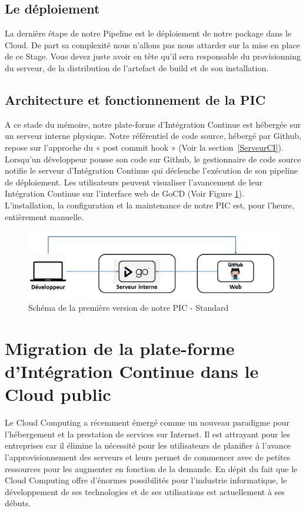       \subsection{Le déploiement}
      La dernière étape de notre Pipeline est le déploiement de notre package dans le Cloud. De part sa complexité nous n'allons pas nous attarder sur la mise en place de ce Stage. Vous devez juste avoir en tête qu'il sera responsable du provisionning du serveur, de la distribution de l'artefact de build et de son installation.

      \subsection{Architecture et fonctionnement de la PIC}
      A ce stade du mémoire, notre plate-forme d'Intégration Continue est hébergée sur un serveur interne physique. Notre référentiel de code source, hébergé par Github, repose sur l'approche du « post commit hook » (Voir la section~\ref{ServeurCI}). Lorsqu'un développeur pousse son code sur Github, le gestionnaire de code source notifie le serveur d'Intégration Continue qui déclenche l'exécution de son pipeline de déploiement. Les utilisateurs peuvent visualiser l'avancement de leur Intégration Continue sur l'interface web de GoCD (Voir Figure \ref{PICv1}).\\

      L'installation, la configuration et la maintenance de notre PIC est, pour l'heure, entièrement manuelle.\\

      \begin{figure}
        \begin{center}
          \includegraphics[scale=0.5]{images/PICv1.png}
        \end{center}
        \caption{Schéma de la première version de notre PIC - Standard}
        \label{PICv1}
      \end{figure}

    \section{Migration de la plate-forme d'Intégration Continue dans le Cloud public}
    Le Cloud Computing a récemment émergé comme un nouveau paradigme pour l'hébergement et la prestation de services sur Internet. Il est attrayant pour les entreprises car il élimine la nécessité pour les utilisateurs de planifier à l'avance l'approvisionnement des serveurs et leurs permet de commencer avec de petites ressources pour les augmenter en fonction de la demande. En dépit du fait que le Cloud Computing offre d'énormes possibilités pour l'industrie informatique, le développement de ses technologies et de ses utilisations est actuellement à ses débuts.

